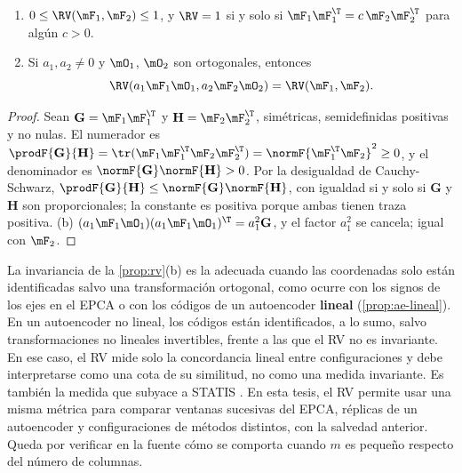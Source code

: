\begin{proposicion}\label{prop:rv}
\begin{enumerate}[label=(\alph*)]
  \item $0\le\RV(\mF_1,\mF_2)\le1$, y $\RV=1$ si y solo si $\mF_1\mF_1^{\T}=c\,\mF_2\mF_2^{\T}$
    para algún $c>0$.
  \item Si $a_1,a_2\ne0$ y $\mO_1$, $\mO_2$ son ortogonales, entonces
    \[\RV(a_1\mF_1\mO_1,a_2\mF_2\mO_2)=\RV(\mF_1,\mF_2).\]
\end{enumerate}
\end{proposicion}

\begin{proof}
Sean $\mathbf{G}=\mF_1\mF_1^{\T}$ y $\mathbf{H}=\mF_2\mF_2^{\T}$, simétricas, semidefinidas
positivas y no nulas. El numerador es
$\prodF{\mathbf{G}}{\mathbf{H}}=\tr(\mF_1\mF_1^{\T}\mF_2\mF_2^{\T})=\normF{\mF_1^{\T}\mF_2}^2\ge0$, y
el denominador es $\normF{\mathbf{G}}\normF{\mathbf{H}}>0$. Por la desigualdad de Cauchy-Schwarz,
$\prodF{\mathbf{G}}{\mathbf{H}}\le\normF{\mathbf{G}}\normF{\mathbf{H}}$, con igualdad si y solo si
$\mathbf{G}$ y $\mathbf{H}$ son proporcionales; la constante es positiva porque ambas tienen traza
positiva. (b) $(a_1\mF_1\mO_1)(a_1\mF_1\mO_1)^{\T}=a_1^2\mathbf{G}$, y el factor $a_1^2$ se cancela;
igual con $\mF_2$.
\end{proof}

La invariancia de la \cref{prop:rv}(b) es la adecuada cuando las coordenadas solo están
identificadas salvo una transformación ortogonal, como ocurre con los signos de los ejes en el EPCA
o con los códigos de un autoencoder \textbf{lineal} (\cref{prop:ae-lineal}). En un autoencoder no
lineal, los códigos están identificados, a lo sumo, salvo transformaciones no lineales invertibles,
frente a las que el RV no es invariante. En ese caso, el RV mide solo la concordancia lineal entre
configuraciones y debe interpretarse como una cota de su similitud, no como una medida invariante.
Es también la medida que subyace a STATIS \parencite{lavit_1988}. En esta tesis, el RV permite usar una misma métrica para comparar ventanas sucesivas del
EPCA, réplicas de un autoencoder y configuraciones de métodos distintos, con la salvedad anterior.
Queda por verificar en la fuente cómo se comporta cuando $m$ es pequeño respecto del número de
columnas.

